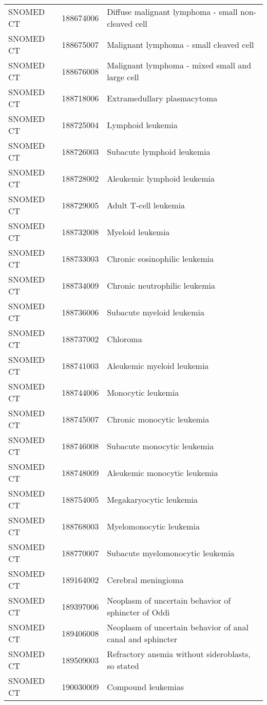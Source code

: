 \begin{longtable}{p{}p{}p{}}
  SNOMED CT & 188674006 & Diffuse malignant lymphoma - small non-cleaved cell \\ 
  SNOMED CT & 188675007 & Malignant lymphoma - small cleaved cell \\ 
  SNOMED CT & 188676008 & Malignant lymphoma - mixed small and large cell \\ 
  SNOMED CT & 188718006 & Extramedullary plasmacytoma \\ 
  SNOMED CT & 188725004 & Lymphoid leukemia \\ 
  SNOMED CT & 188726003 & Subacute lymphoid leukemia \\ 
  SNOMED CT & 188728002 & Aleukemic lymphoid leukemia \\ 
  SNOMED CT & 188729005 & Adult T-cell leukemia \\ 
  SNOMED CT & 188732008 & Myeloid leukemia \\ 
  SNOMED CT & 188733003 & Chronic eosinophilic leukemia \\ 
  SNOMED CT & 188734009 & Chronic neutrophilic leukemia \\ 
  SNOMED CT & 188736006 & Subacute myeloid leukemia \\ 
  SNOMED CT & 188737002 & Chloroma \\ 
  SNOMED CT & 188741003 & Aleukemic myeloid leukemia \\ 
  SNOMED CT & 188744006 & Monocytic leukemia \\ 
  SNOMED CT & 188745007 & Chronic monocytic leukemia \\ 
  SNOMED CT & 188746008 & Subacute monocytic leukemia \\ 
  SNOMED CT & 188748009 & Aleukemic monocytic leukemia \\ 
  SNOMED CT & 188754005 & Megakaryocytic leukemia \\ 
  SNOMED CT & 188768003 & Myelomonocytic leukemia \\ 
  SNOMED CT & 188770007 & Subacute myelomonocytic leukemia \\ 
  SNOMED CT & 189164002 & Cerebral meningioma \\ 
  SNOMED CT & 189397006 & Neoplasm of uncertain behavior of sphincter of Oddi \\ 
  SNOMED CT & 189406008 & Neoplasm of uncertain behavior of anal canal and sphincter \\ 
  SNOMED CT & 189509003 & Refractory anemia without sideroblasts, so stated \\ 
  SNOMED CT & 190030009 & Compound leukemias \\ 

\end{longtable}
